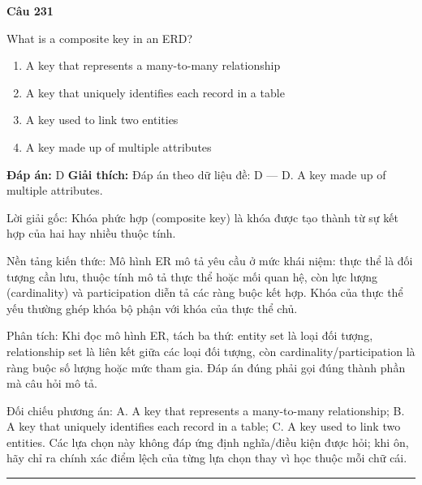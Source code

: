 \documentclass[11pt,a4paper]{article}
\newenvironment{question}[1]{%
  \par\vspace{1em}\noindent\textbf{\large Câu #1}\par\vspace{0.4em}
}{%
  \par\vspace{1em}\hrule\vspace{0.6em}
}
\newenvironment{choices}{%
  \begin{enumerate}[label=\textbf{\Alph*.},leftmargin=2.2em,itemsep=2pt,topsep=3pt]
}{%
  \end{enumerate}
}
\newcommand{\choice}{\item}
\begin{document}
\begin{question}{231}
What is a composite key in an ERD?
\begin{choices}
\choice A key that represents a many-to-many relationship
\choice A key that uniquely identifies each record in a table
\choice A key used to link two entities
\choice A key made up of multiple attributes
\end{choices}
\textbf{Đáp án:} D
\textbf{Giải thích:} Đáp án theo dữ liệu đề: D — D. A key made up of multiple attributes.

Lời giải gốc: Khóa phức hợp (composite key) là khóa được tạo thành từ sự kết hợp của hai hay nhiều thuộc tính.

Nền tảng kiến thức: Mô hình ER mô tả yêu cầu ở mức khái niệm: thực thể là đối tượng cần lưu, thuộc tính mô tả thực thể hoặc mối quan hệ, còn lực lượng (cardinality) và participation diễn tả các ràng buộc kết hợp. Khóa của thực thể yếu thường ghép khóa bộ phận với khóa của thực thể chủ.

Phân tích: Khi đọc mô hình ER, tách ba thứ: entity set là loại đối tượng, relationship set là liên kết giữa các loại đối tượng, còn cardinality/participation là ràng buộc số lượng hoặc mức tham gia. Đáp án đúng phải gọi đúng thành phần mà câu hỏi mô tả.

Đối chiếu phương án: A. A key that represents a many-to-many relationship; B. A key that uniquely identifies each record in a table; C. A key used to link two entities. Các lựa chọn này không đáp ứng định nghĩa/điều kiện được hỏi; khi ôn, hãy chỉ ra chính xác điểm lệch của từng lựa chọn thay vì học thuộc mỗi chữ cái.
\end{question}
\end{document}
